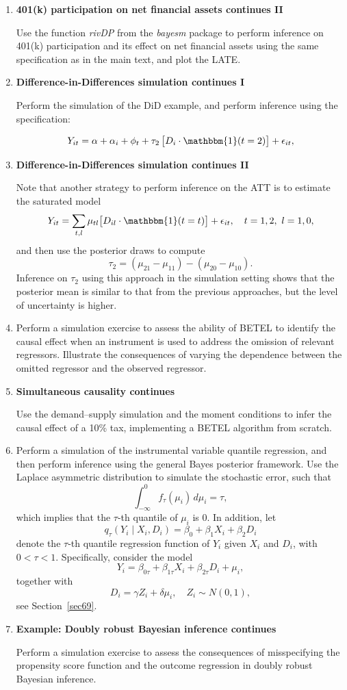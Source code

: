 \begin{enumerate}
	\item \textbf{401(k) participation on net financial assets continues II} 
	
	Use the function \textit{rivDP} from the \textit{bayesm} package to perform inference on 401(k) participation and its effect on net financial assets using the same specification as in the main text, and plot the LATE.
	
	\item \textbf{Difference-in-Differences simulation continues I}
	
	Perform the simulation of the DiD example, and perform inference using the specification:
	
	\[
	Y_{it} = \alpha + \alpha_i + \phi_t + \tau_2 \,\big[ D_i \cdot \mathbbm{1}(t = 2) \big] + \epsilon_{it},
	\]
	
	\item \textbf{Difference-in-Differences simulation continues II}
	
	Note that another strategy to perform inference on the ATT is to estimate the saturated model
	\[
	Y_{it} = \sum_{t,l} \mu_{tl} \big[ D_{il} \cdot \mathbbm{1}(t = t) \big] + \epsilon_{it}, \quad t = 1, 2, \ l = 1, 0,
	\]
	and then use the posterior draws to compute
	\[
	\tau_2 = (\mu_{21} - \mu_{11}) - (\mu_{20} - \mu_{10}).
	\]
	Inference on $\tau_2$ using this approach in the simulation setting shows that the posterior mean is similar to that from the previous approaches, but the level of uncertainty is higher.
	
	\item Perform a simulation exercise to assess the ability of BETEL to identify the causal effect when an instrument is used to address the omission of relevant regressors. Illustrate the consequences of varying the dependence between the omitted regressor and the observed regressor.
	
	\item \textbf{Simultaneous causality continues}
	
	Use the demand–supply simulation and the moment conditions to infer the causal effect of a	10\% tax, implementing a BETEL algorithm from scratch.
	
	\item Perform a simulation of the instrumental variable quantile regression, and then perform inference using the general Bayes posterior framework. Use the Laplace asymmetric distribution to simulate the stochastic error, such that 
	\[
	\int_{-\infty}^{0} f_{\tau}(\mu_i) \, d\mu_i = \tau,
	\] 
	which implies that the $\tau$-th quantile of $\mu_i$ is 0. In addition, let 
	\[
	q_{\tau}(Y_i \mid X_i, D_i) = \beta_0 + \beta_1 X_i + \beta_2 D_i
	\] 
	denote the $\tau$-th quantile regression function of $Y_i$ given $X_i$ and $D_i$, with $0 < \tau < 1$. Specifically, consider the model
	\[
	Y_i = \beta_{0\tau} + \beta_{1\tau} X_i + \beta_{2\tau} D_i + \mu_i,
	\]
	together with 
	\[
	D_i = \gamma Z_i + \delta \mu_i, \quad Z_i \sim N(0,1),
	\]
	see Section~\ref{sec69}.
	
	\item \textbf{Example: Doubly robust Bayesian inference continues}
	
	Perform a simulation exercise to assess the consequences of misspecifying the propensity score function and the outcome regression in doubly robust Bayesian inference.	
\end{enumerate}
